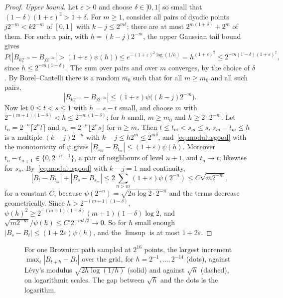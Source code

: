 \begin{proof}
\emph{Upper bound.} Let $\varepsilon>0$ and choose $\delta\in]0,1[$ so small that $(1-\delta)(1+\varepsilon)^2>1+\delta$. For $m\ge1$, consider all pairs of dyadic points $j2^{-m}<k2^{-m}$ of $[0,1]$ with
$k-j\le2^{m\delta}$; there are at most $2^{m(1+\delta)}+2^m$ of them. For such a pair, with $h=(k-j)2^{-m}$, the upper Gaussian tail bound gives
\[
P\bigl(|B_{k2^{-m}}-B_{j2^{-m}}|>(1+\varepsilon)\psi(h)\bigr)\le e^{-(1+\varepsilon)^2\log(1/h)}=h^{(1+\varepsilon)^2}\le2^{-m(1-\delta)(1+\varepsilon)^2},
\]
since $h\le2^{-m(1-\delta)}$. The sum over pairs and over $m$ converges, by the choice of $\delta$. By Borel--Cantelli there is a random $m_0$ such that for all $m\ge m_0$ and all such pairs,
\begin{equation}\label{eq:modulusgood}
|B_{k2^{-m}}-B_{j2^{-m}}|\le(1+\varepsilon)\psi\bigl((k-j)2^{-m}\bigr).
\end{equation}
Now let $0\le t<s\le1$ with $h=s-t$ small, and choose $m$ with $2^{-(m+1)(1-\delta)}<h\le2^{-m(1-\delta)}$; for $h$ small, $m\ge m_0$ and $h\ge2\cdot2^{-m}$. Let $t_n=2^{-n}\lceil2^nt\rceil$ and $s_n=2^{-n}\lfloor2^ns\rfloor$
for $n\ge m$. Then $t\le t_m<s_m\le s$, $s_m-t_m\le h$ is a multiple $(k-j)2^{-m}$ with $k-j\le h2^m\le2^{m\delta}$, and~\eqref{eq:modulusgood} with the monotonicity of $\psi$ gives
$|B_{s_m}-B_{t_m}|\le(1+\varepsilon)\psi(h)$. Moreover $t_n-t_{n+1}\in\{0,2^{-n-1}\}$, a pair of neighbours of level $n+1$, and $t_n\to t$; likewise for $s_n$. By~\eqref{eq:modulusgood} with $k-j=1$ and continuity,
\[
|B_t-B_{t_m}|+|B_s-B_{s_m}|\le2\sum_{n>m}(1+\varepsilon)\psi(2^{-n})\le C\sqrt{m2^{-m}},
\]
for a constant $C$, because $\psi(2^{-n})=\sqrt{2n\log2\cdot2^{-n}}$ and the terms decrease geometrically. Since $h>2^{-(m+1)(1-\delta)}$, $\psi(h)^2\ge2^{-(m+1)(1-\delta)}(m+1)(1-\delta)\log2$, and
$\sqrt{m2^{-m}}/\psi(h)\le C'2^{-m\delta/2}\to0$. So for $h$ small enough $|B_s-B_t|\le(1+2\varepsilon)\psi(h)$, and the $\limsup$ is at most $1+2\varepsilon$.
\end{proof}

\begin{figure}[ht]
\centering
{}
\caption{For one Brownian path sampled at $2^{16}$ points, the largest increment $\max_t|B_{t+h}-B_t|$ over the grid, for $h=2^{-1},\dots,2^{-14}$ (dots), against L\'evy's modulus
$\sqrt{2h\log(1/h)}$ (solid) and against $\sqrt h$ (dashed), on logarithmic scales. The gap between $\sqrt h$ and the dots is the logarithm.}
\label{fig:modulus}
\end{figure}

